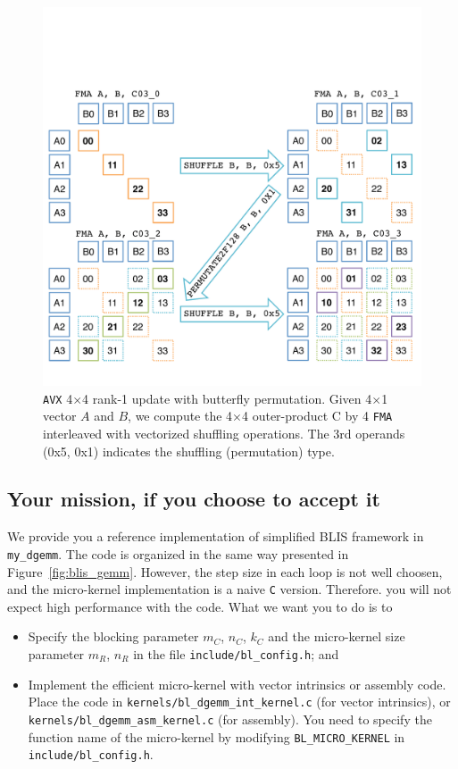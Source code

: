 \begin{figure}
\begin{center}
	\includegraphics[width=5in]{figures/avx_permute.pdf}
\end{center}
\caption{{\tt AVX} 4$\times$4 rank-1 update with butterfly permutation. Given 4$\times$1 vector $A$ and $B$, we compute the 4$\times$4 outer-product C by 4 {\tt FMA} interleaved with vectorized shuffling operations. The 3rd operands (0x5, 0x1) indicates the shuffling (permutation) type.}
\label{fig:permutation}
\end{figure}

\subsection{Your mission, if you choose to accept it}
We provide you a reference implementation of simplified BLIS framework in {\tt my\_dgemm}. The code is organized in the same way presented in Figure~\ref{fig:blis_gemm}. However, the step size in each loop is not well choosen, and the micro-kernel implementation is a naive {\tt C} version. Therefore. you will not expect high performance with the code. What we want you to do is to 
\begin{itemize}
\item Specify the blocking parameter $ m_C $, $ n_C $, $ k_C $ and the micro-kernel size parameter $ m_R $, $ n_R $ in the file {\tt include/bl\_config.h}; and
\item Implement the efficient micro-kernel with vector intrinsics or assembly code. Place the code in {\tt kernels/bl\_dgemm\_int\_kernel.c} (for vector intrinsics), or {\tt kernels/bl\_dgemm\_asm\_kernel.c} (for assembly). You need to specify the function name of the micro-kernel by modifying {\tt BL\_MICRO\_KERNEL} in {\tt include/bl\_config.h}.
\end{itemize}


